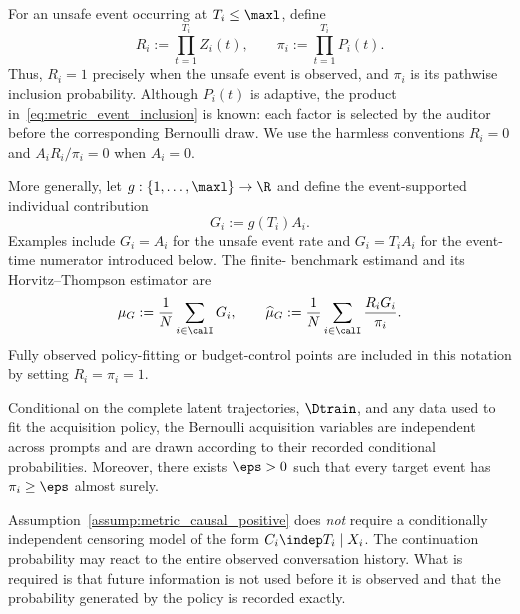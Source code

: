 For an unsafe event occurring at $T_i\leq\maxl$, define
\begin{equation}
    R_i := \prod_{t=1}^{T_i} Z_i(t),
    \qquad
    \pi_i := \prod_{t=1}^{T_i} P_i(t).
    \label{eq:metric_event_inclusion}
\end{equation}
Thus, $R_i=1$ precisely when the unsafe event is observed, and $\pi_i$ is its
pathwise inclusion probability.  Although $P_i(t)$ is adaptive, the product
in~\eqref{eq:metric_event_inclusion} is known: each factor is selected by the
auditor before the corresponding Bernoulli draw.  We use the harmless
conventions $R_i=0$ and $A_iR_i/\pi_i=0$ when $A_i=0$.

More generally, let $g:\{1,\ldots,\maxl\}\rightarrow\R$ and define the
event-supported individual contribution
\begin{equation}
    G_i := g(T_i)A_i.
\end{equation}
Examples include $G_i=A_i$ for the unsafe event rate and
$G_i=T_iA_i$ for the event-time numerator introduced below.  The finite-
benchmark estimand and its Horvitz--Thompson estimator are
\begin{equation}
    \mu_G := \frac{1}{N}\sum_{i\in\calI}G_i,
    \qquad
    \widehat\mu_G := \frac{1}{N}\sum_{i\in\calI}
    \frac{R_iG_i}{\pi_i}.
    \label{eq:metric_ht_estimator}
\end{equation}
Fully observed policy-fitting or budget-control points are included in this
notation by setting $R_i=\pi_i=1$.

\begin{assumption}
\label{assump:metric_causal_positive}
Conditional on the complete latent trajectories, $\Dtrain$, and any data used
to fit the acquisition policy, the Bernoulli acquisition variables are
independent across prompts and are drawn according to their recorded
conditional probabilities.  Moreover, there exists $\eps>0$ such that every
target event has $\pi_i\geq\eps$ almost surely.
\end{assumption}

Assumption~\ref{assump:metric_causal_positive} does \emph{not} require a
conditionally independent censoring model of the form $C_i\indep T_i\mid
X_i$.  The continuation probability may react to the entire observed
conversation history.  What is required is that future information is not
used before it is observed and that the probability generated by the policy
is recorded exactly.

